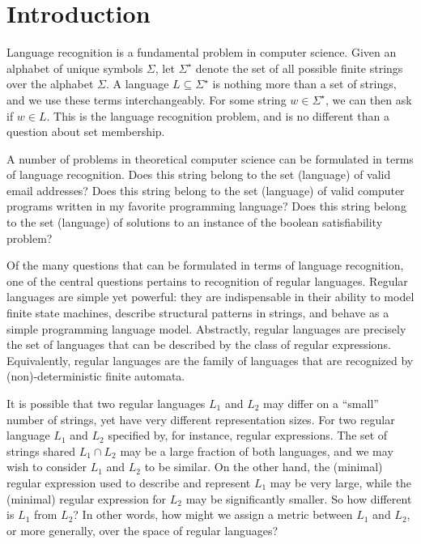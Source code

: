 
\section{Introduction}

Language recognition is a fundamental problem in computer science.
Given an alphabet of unique symbols \(\Sigma\),
let \(\Sigma^\star\) denote the set of all possible finite strings over
the alphabet \(\Sigma\).
A language \(L \subseteq \Sigma^\star\) is nothing more than a set of strings,
and we use these terms interchangeably.
For some string \(w \in \Sigma^\star\),
we can then ask if \(w \in L\).
This is the language recognition problem,
and is no different than a question about set membership.

A number of problems in theoretical computer science can be formulated
in terms of language recognition.
Does this string belong to the set (language) of valid email addresses?
Does this string belong to the set (language) of valid
computer programs written in my favorite programming language?
Does this string belong to the set (language) of solutions
to an instance of the boolean satisfiability problem?

Of the many questions that can be formulated in terms of language recognition,
one of the central questions pertains to recognition of regular languages.
Regular languages are simple yet powerful:
they are indispensable in their ability to model
finite state machines,
describe structural patterns in strings,
and behave as a simple programming language model.
Abstractly, regular languages are precisely the set of languages that
can be described by the class of regular expressions.
Equivalently, regular languages are the family of languages
that are recognized by (non)-deterministic finite automata.

It is possible that two regular languages \(L_1\) and \(L_2\)
may differ on a ``small'' number of strings, yet
have very different representation sizes.
For two regular language \(L_1\) and \(L_2\) specified by,
for instance, regular expressions.
The set of strings shared \(L_1 \cap L_2\) may be a large fraction of both
languages, and we may wish to consider \(L_1\) and \(L_2\) to be similar.
On the other hand,
the (minimal) regular expression used to describe and represent
\(L_1\) may be very large, while the (minimal) regular
expression for \(L_2\) may be significantly smaller.
So how different is \(L_1\) from \(L_2\)?
In other words, how might we assign a metric between \(L_1\) and \(L_2\),
or more generally, over the space of regular languages?

